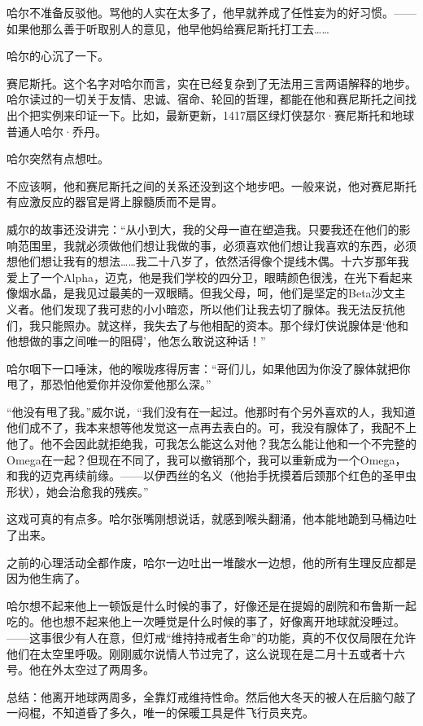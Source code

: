 \documentclass[../main]{subfiles}
\begin{document}
哈尔不准备反驳他。骂他的人实在太多了，他早就养成了任性妄为的好习惯。——如果他那么善于听取别人的意见，他早他妈给赛尼斯托打工去……

哈尔的心沉了一下。

赛尼斯托。这个名字对哈尔而言，实在已经复杂到了无法用三言两语解释的地步。哈尔读过的一切关于友情、忠诚、宿命、轮回的哲理，都能在他和赛尼斯托之间找出个把实例来印证一下。比如，最新更新，1417扇区绿灯侠瑟尔·赛尼斯托和地球普通人哈尔·乔丹。

哈尔突然有点想吐。

不应该啊，他和赛尼斯托之间的关系还没到这个地步吧。一般来说，他对赛尼斯托有应激反应的器官是肾上腺髓质而不是胃。

威尔的故事还没讲完：“从小到大，我的父母一直在塑造我。只要我还在他们的影响范围里，我就必须做他们想让我做的事，必须喜欢他们想让我喜欢的东西，必须想他们想让我有的想法……我二十八岁了，依然活得像个提线木偶。十六岁那年我爱上了一个Alpha，迈克，他是我们学校的四分卫，眼睛颜色很浅，在光下看起来像烟水晶，是我见过最美的一双眼睛。但我父母，呵，他们是坚定的Beta沙文主义者。他们发现了我可悲的小小暗恋，所以他们让我去切了腺体。我无法反抗他们，我只能照办。就这样，我失去了与他相配的资本。那个绿灯侠说腺体是`他和他想做的事之间唯一的阻碍'，他怎么敢说这种话！”

哈尔咽下一口唾沫，他的喉咙疼得厉害：“哥们儿，如果他因为你没了腺体就把你甩了，那恐怕他爱你并没你爱他那么深。”

“他没有甩了我。”威尔说，“我们没有在一起过。他那时有个另外喜欢的人，我知道他们成不了，我本来想等他发觉这一点再去表白的。可，我没有腺体了，我配不上他了。他不会因此就拒绝我，可我怎么能这么对他？我怎么能让他和一个不完整的Omega在一起？但现在不同了，我可以撤销那个，我可以重新成为一个Omega，和我的迈克再续前缘。——以伊西丝的名义（他抬手抚摸着后颈那个红色的圣甲虫形状），她会治愈我的残疾。”

这戏可真的有点多。哈尔张嘴刚想说话，就感到喉头翻涌，他本能地跪到马桶边吐了出来。

之前的心理活动全都作废，哈尔一边吐出一堆酸水一边想，他的所有生理反应都是因为他生病了。

哈尔想不起来他上一顿饭是什么时候的事了，好像还是在提姆的剧院和布鲁斯一起吃的。他也想不起来他上一次睡觉是什么时候的事了，好像离开地球就没睡过。——这事很少有人在意，但灯戒“维持持戒者生命”的功能，真的不仅仅局限在允许他们在太空里呼吸。刚刚威尔说情人节过完了，这么说现在是二月十五或者十六号。他在外太空过了两周多。

总结：他离开地球两周多，全靠灯戒维持性命。然后他大冬天的被人在后脑勺敲了一闷棍，不知道昏了多久，唯一的保暖工具是件飞行员夹克。
\end{document}
